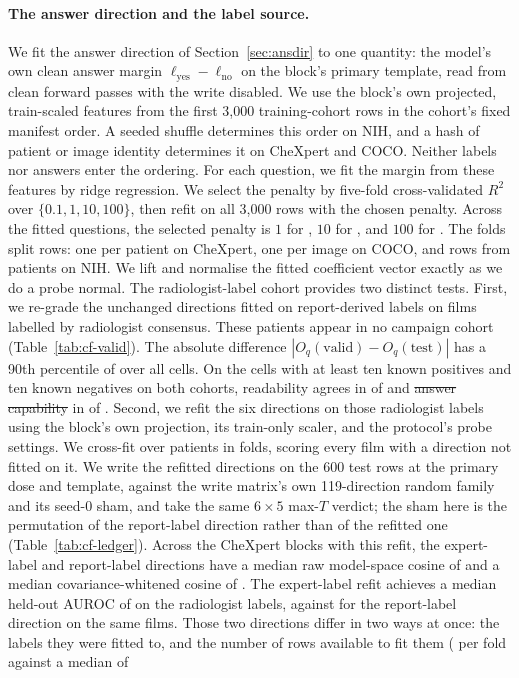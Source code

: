 \documentclass{article}
\makeatletter
\providecommand{\DIFaddtex}[1]{{\protect\color{blue}\uwave{#1}}} %
\providecommand{\DIFdeltex}[1]{{\protect\color{red}\sout{#1}}} %
\providecommand{\DIFaddbegin}{} %
\providecommand{\DIFaddend}{} %
\providecommand{\DIFdelbegin}{} %
\providecommand{\DIFdelend}{} %
\providecommand{\DIFadd}[1]{\texorpdfstring{\DIFaddtex{#1}}{#1}} %
\providecommand{\DIFdel}[1]{\texorpdfstring{\DIFdeltex{#1}}{}} %
\providecommand{\DIFscaledelfig}{0.5}
\newlength{\DIFdelgraphicswidth} %
\newlength{\DIFdelgraphicsheight} %
\providecommand{\DIFaddincludegraphics}[2][]{{\color{blue}\fbox{\DIFOincludegraphics[#1]{#2}}}} %
\providecommand{\DIFdelincludegraphics}[2][]{%
\sbox{\DIFdelgraphicsbox}{\DIFOincludegraphics[#1]{#2}}%
\settoboxwidth{\DIFdelgraphicswidth}{\DIFdelgraphicsbox} %
\settoboxtotalheight{\DIFdelgraphicsheight}{\DIFdelgraphicsbox} %
\scalebox{\DIFscaledelfig}{%
\parbox[b]{\DIFdelgraphicswidth}{\usebox{\DIFdelgraphicsbox}\\[-\baselineskip] \rule{\DIFdelgraphicswidth}{0em}}\llap{\resizebox{\DIFdelgraphicswidth}{\DIFdelgraphicsheight}{%
\setlength{\unitlength}{\DIFdelgraphicswidth}%
\begin{picture}(1,1)%
\thicklines\linethickness{2pt} %
{\color[rgb]{1,0,0}\put(0,0){\framebox(1,1){}}}%
{\color[rgb]{1,0,0}\put(0,0){\line( 1,1){1}}}%
{\color[rgb]{1,0,0}\put(0,1){\line(1,-1){1}}}%
\end{picture}%
}\hspace*{3pt}}} %
} %
\DeclareRobustCommand{\DIFaddbegin}{\DIFOaddbegin \let\includegraphics\DIFaddincludegraphics} %
\DeclareRobustCommand{\DIFaddend}{\DIFOaddend \let\includegraphics\DIFOincludegraphics} %
\DeclareRobustCommand{\DIFdelbegin}{\DIFOdelbegin \let\includegraphics\DIFdelincludegraphics} %
\DeclareRobustCommand{\DIFdelend}{\DIFOaddend \let\includegraphics\DIFOincludegraphics} %
\let\sout@orig\sout %
\renewcommand{\sout}[1]{\ifmmode\text{\sout@orig{\ensuremath{#1}}}\else\sout@orig{#1}\fi} %
\makeatother
\begin{document}
\paragraph{The answer direction and the label source.} We fit the answer direction of Section~\ref{sec:ansdir} to one quantity: the model's own clean answer margin $\ell_{\mathrm{yes}}-\ell_{\mathrm{no}}$ on the block's primary template, read from clean forward passes with the write disabled. We use the block's own projected, train-scaled features from the first 3{,}000 training-cohort rows in the cohort's fixed manifest order. A seeded shuffle determines this order on NIH, and a hash of patient or image identity determines it on CheXpert and COCO. Neither labels nor answers enter the ordering. For each question, we fit the margin from these features by ridge regression. We select the penalty by five-fold cross-validated $R^2$ over $\{0.1,1,10,100\}$, then refit on all 3{,}000 rows with the chosen penalty. Across the \cfAnsAlphaCells{} fitted questions, the selected penalty is $1$ for \cfAnsAlphaOne{}, $10$ for \cfAnsAlphaTen{}, and $100$ for \cfAnsAlphaHundred{}. The folds split rows: one per patient on CheXpert, one per image on COCO, and rows from \cfAnsTrainUnitsNih{} patients on NIH. We lift and normalise the fitted coefficient vector exactly as we do a probe normal. The radiologist-label cohort provides two distinct tests. First, we re-grade the unchanged directions fitted on report-derived labels on \cfValidRows{} films labelled by radiologist consensus. These patients appear in no campaign cohort (Table~\ref{tab:cf-valid}). The absolute difference $|O_q(\text{valid})-O_q(\text{test})|$ has a 90th percentile of \cfValidNinetyDO{} over all cells. On the \cfValidSupported{} cells with at least ten known positives and ten known negatives on both cohorts, readability agrees in \cfValidReadableAgree{} of \cfValidReadableN{} and \DIFdelbegin \DIFdel{answer capability }\DIFdelend \DIFaddbegin \DIFadd{answerability }\DIFaddend in \cfValidAnswerAgree{} of \cfValidAnswerN{}. Second, we refit the six directions on those radiologist labels using the block's own projection, its train-only scaler, and the protocol's probe settings. We cross-fit over patients in \cfValidfitFolds{} folds, scoring every film with a direction not fitted on it. We write the refitted directions on the 600 test rows at the primary dose and template, against the write matrix's own 119-direction random family and its seed-0 sham, and take the same $6\times5$ max-$T$ verdict; the sham here is the permutation of the report-label direction rather than of the refitted one (Table~\ref{tab:cf-ledger}). Across the \cfValidfitBlocks{} CheXpert blocks with this refit, the expert-label and report-label directions have a median raw model-space cosine of \cfValidfitCosRaw{} and a median covariance-whitened cosine of \cfValidfitCosWhitened{}. The expert-label refit achieves a median held-out AUROC of \cfValidfitAurocExpert{} on the radiologist labels, against \cfValidfitAurocReportDir{} for the report-label direction on the same films. Those two directions differ in two ways at once: the labels they were fitted to, and the number of rows available to fit them (\cfVfArmExpertRows{} per fold against a median of 
\end{document}

